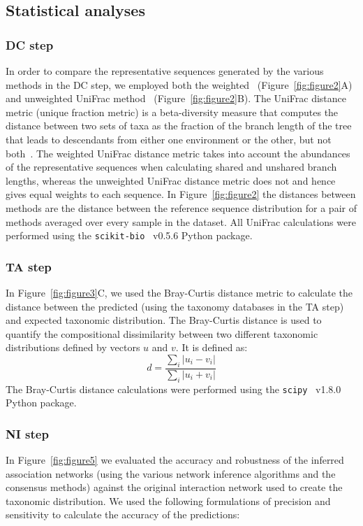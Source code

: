   \subsection*{Statistical analyses}

  \subsubsection*{DC step}
  \vspace{-5mm}
  In order to compare the representative sequences generated by the various methods in the DC step, we employed both the weighted~\cite{Lozupone2007} (Figure~\ref{fig:figure2}A) and unweighted UniFrac method~\cite{Lozupone2005} (Figure~\ref{fig:figure2}B).
  The UniFrac distance metric (unique fraction metric) is a beta-diversity measure that computes the distance between two sets of taxa as the fraction of the branch length of the tree that leads to descendants from either one environment or the other, but not both~\cite{Lozupone2005}.
  The weighted UniFrac distance metric takes into account the abundances of the representative sequences when calculating shared and unshared branch lengths, whereas the unweighted UniFrac distance metric does not and hence gives equal weights to each sequence.
  In Figure~\ref{fig:figure2} the distances between methods are the distance between the reference sequence distribution for a pair of methods averaged over every sample in the dataset.
  All UniFrac calculations were performed using the \texttt{scikit-bio}~\cite{thescikit-biodevelopmentteamScikitbioBioinformaticsLibrary2022} v0.5.6 Python package.

  \subsubsection*{TA step}
  \vspace{-5mm}
  In Figure~\ref{fig:figure3}C, we used the Bray-Curtis distance metric to calculate the distance between the predicted (using the taxonomy databases in the TA step) and expected taxonomic distribution.
  The Bray-Curtis distance is used to quantify the compositional dissimilarity between two different taxonomic distributions defined by vectors $u$ and $v$.
  It is defined as:
  $$d = \frac{\sum_i{|u_i-v_i|}}{\sum_i{|u_i+v_i|}}$$
  The Bray-Curtis distance calculations were performed using the \texttt{scipy}~\cite{virtanenSciPyFundamentalAlgorithms2020} v1.8.0 Python package.

  \subsubsection*{NI step}
  \vspace{-5mm}
  In Figure~\ref{fig:figure5} we evaluated the accuracy and robustness of the inferred association networks (using the various network inference algorithms and the consensus methods) against the original interaction network used to create the taxonomic distribution.
  We used the following formulations of precision and sensitivity to calculate the accuracy of the predictions:

